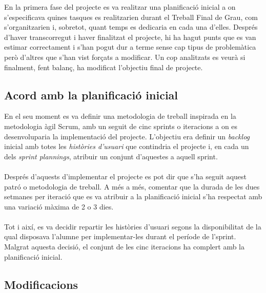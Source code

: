 En la primera fase del projecte es va realitzar una planificació inicial a on s'especificava quines tasques es realitzarien durant el Treball Final de Grau, com s'organitzarien i, sobretot, quant temps es dedicaria en cada una d'elles. Després d'haver transcorregut i haver finalitzat el projecte, hi ha hagut punts que es van estimar correctament i s'han pogut dur a terme sense cap tipus de problemàtica però d'altres que s'han vist forçats a modificar. Un cop analitzats es veurà si finalment, fent balanç, ha modificat l'objectiu final de projecte.

\subsection{Acord amb la planificació inicial}

En el seu moment es va definir una metodologia de treball inspirada en la metodologia àgil Scrum, amb un seguit de cinc sprints o iteracions a on es desenvoluparia la implementació del projecte. L'objectiu era definir un \textit{backlog} inicial amb totes les \textit{històries d'usuari} que contindria el projecte i, en cada un dels \textit{sprint plannings}, atribuir un conjunt d'aquestes a aquell sprint.
\\\\
Després d'aquests d'implementar el projecte es pot dir que s'ha seguit aquest patró o metodologia de treball. A més a més, comentar que la durada de les dues setmanes per iteració que es va atribuir a la planificació inicial s'ha respectat amb una variació màxima de 2 o 3 dies.
\\\\
Tot i així, es va decidir repartir les històries d'usuari segons la disponibilitat de la qual disposava l'alumne per implementar-les durant el període de l'sprint. Malgrat aquesta decisió, el conjunt de les cinc iteracions ha complert amb la planificació inicial.

\subsection{Modificacions}

